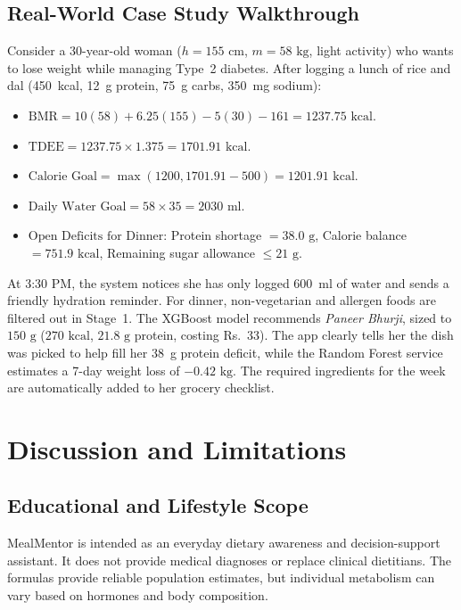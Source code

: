 \documentclass[10pt, conference, letterpaper]{IEEEtran}
\begin{document}
\subsection{Real-World Case Study Walkthrough}
Consider a 30-year-old woman ($h = 155\text{ cm}$, $m = 58\text{ kg}$, light activity) who wants to lose weight while managing Type~2 diabetes. After logging a lunch of rice and dal (450~kcal, 12~g protein, 75~g carbs, 350~mg sodium):
\begin{itemize}[leftmargin=*, nosep]
    \item $\text{BMR} = 10(58) + 6.25(155) - 5(30) - 161 = 1237.75\text{ kcal}$.
    \item $\text{TDEE} = 1237.75 \times 1.375 = 1701.91\text{ kcal}$.
    \item $\text{Calorie Goal} = \max(1200, 1701.91 - 500) = 1201.91\text{ kcal}$.
    \item $\text{Daily Water Goal} = 58 \times 35 = 2030\text{ ml}$.
    \item $\text{Open Deficits for Dinner}$: Protein shortage $= 38.0\text{ g}$, Calorie balance $= 751.9\text{ kcal}$, Remaining sugar allowance $\le 21\text{ g}$.
\end{itemize}

At 3:30 PM, the system notices she has only logged 600~ml of water and sends a friendly hydration reminder. For dinner, non-vegetarian and allergen foods are filtered out in Stage~1. The XGBoost model recommends \textit{Paneer Bhurji}, sized to $150\text{ g}$ ($270\text{ kcal}$, $21.8\text{ g}$ protein, costing Rs.~33). The app clearly tells her the dish was picked to help fill her 38~g protein deficit, while the Random Forest service estimates a 7-day weight loss of $-0.42\text{ kg}$. The required ingredients for the week are automatically added to her grocery checklist.

\section{Discussion and Limitations}

\subsection{Educational and Lifestyle Scope}
MealMentor is intended as an everyday dietary awareness and decision-support assistant. It does not provide medical diagnoses or replace clinical dietitians. The formulas provide reliable population estimates, but individual metabolism can vary based on hormones and body composition.
\end{document}
